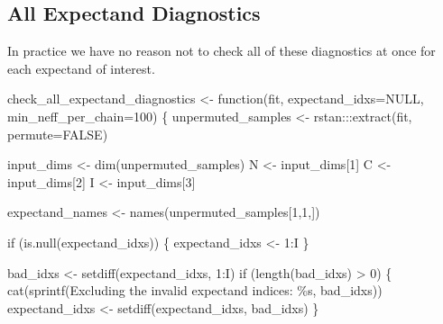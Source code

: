 \documentclass[
  letterpaper,
  DIV=11,
  numbers=noendperiod]{scrartcl}
\newenvironment{Shaded}{\begin{snugshade}}{\end{snugshade}}
\newcommand{\AttributeTok}[1]{\textcolor[rgb]{0.40,0.45,0.13}{#1}}
\newcommand{\ConstantTok}[1]{\textcolor[rgb]{0.56,0.35,0.01}{#1}}
\newcommand{\ControlFlowTok}[1]{\textcolor[rgb]{0.00,0.23,0.31}{#1}}
\newcommand{\DecValTok}[1]{\textcolor[rgb]{0.68,0.00,0.00}{#1}}
\newcommand{\FunctionTok}[1]{\textcolor[rgb]{0.28,0.35,0.67}{#1}}
\newcommand{\NormalTok}[1]{\textcolor[rgb]{0.00,0.23,0.31}{#1}}
\newcommand{\OtherTok}[1]{\textcolor[rgb]{0.00,0.23,0.31}{#1}}
\newcommand{\SpecialCharTok}[1]{\textcolor[rgb]{0.37,0.37,0.37}{#1}}
\newcommand{\StringTok}[1]{\textcolor[rgb]{0.13,0.47,0.30}{#1}}
\begin{document}
\hypertarget{all-expectand-diagnostics}{%
\subsection{All Expectand Diagnostics}\label{all-expectand-diagnostics}}

In practice we have no reason not to check all of these diagnostics at
once for each expectand of interest.

\begin{Shaded}
\begin{Highlighting}[]
\NormalTok{check\_all\_expectand\_diagnostics }\OtherTok{\textless{}{-}} \ControlFlowTok{function}\NormalTok{(fit,}
                                            \AttributeTok{expectand\_idxs=}\ConstantTok{NULL}\NormalTok{,}
                                            \AttributeTok{min\_neff\_per\_chain=}\DecValTok{100}\NormalTok{) \{}
\NormalTok{  unpermuted\_samples }\OtherTok{\textless{}{-}}\NormalTok{ rstan}\SpecialCharTok{:::}\FunctionTok{extract}\NormalTok{(fit, }\AttributeTok{permute=}\ConstantTok{FALSE}\NormalTok{)}

\NormalTok{  input\_dims }\OtherTok{\textless{}{-}} \FunctionTok{dim}\NormalTok{(unpermuted\_samples)}
\NormalTok{  N }\OtherTok{\textless{}{-}}\NormalTok{ input\_dims[}\DecValTok{1}\NormalTok{]}
\NormalTok{  C }\OtherTok{\textless{}{-}}\NormalTok{ input\_dims[}\DecValTok{2}\NormalTok{]}
\NormalTok{  I }\OtherTok{\textless{}{-}}\NormalTok{ input\_dims[}\DecValTok{3}\NormalTok{]}

\NormalTok{  expectand\_names }\OtherTok{\textless{}{-}} \FunctionTok{names}\NormalTok{(unpermuted\_samples[}\DecValTok{1}\NormalTok{,}\DecValTok{1}\NormalTok{,])}

  \ControlFlowTok{if}\NormalTok{ (}\FunctionTok{is.null}\NormalTok{(expectand\_idxs)) \{}
\NormalTok{    expectand\_idxs }\OtherTok{\textless{}{-}} \DecValTok{1}\SpecialCharTok{:}\NormalTok{I}
\NormalTok{  \}}

\NormalTok{  bad\_idxs }\OtherTok{\textless{}{-}} \FunctionTok{setdiff}\NormalTok{(expectand\_idxs, }\DecValTok{1}\SpecialCharTok{:}\NormalTok{I)}
  \ControlFlowTok{if}\NormalTok{ (}\FunctionTok{length}\NormalTok{(bad\_idxs) }\SpecialCharTok{\textgreater{}} \DecValTok{0}\NormalTok{) \{}
    \FunctionTok{cat}\NormalTok{(}\FunctionTok{sprintf}\NormalTok{(}\StringTok{\textquotesingle{}Excluding the invalid expectand indices: \%s\textquotesingle{}}\NormalTok{,}
\NormalTok{                bad\_idxs))}
\NormalTok{    expectand\_idxs }\OtherTok{\textless{}{-}} \FunctionTok{setdiff}\NormalTok{(expectand\_idxs, bad\_idxs)}
\NormalTok{  \}}


\end{Highlighting}
\end{Shaded}
\end{document}
